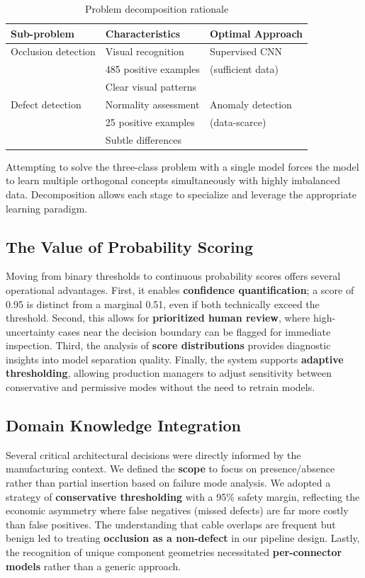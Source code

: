 \documentclass[11pt,a4paper,draft]{article}
\begin{document}
\begin{table}[H]
\centering
\begin{tabular}{lll}
\toprule
\textbf{Sub-problem} & \textbf{Characteristics} & \textbf{Optimal Approach} \\
\midrule
Occlusion detection & Visual recognition & Supervised CNN \\
 & 485 positive examples & (sufficient data) \\
 & Clear visual patterns & \\
\midrule
Defect detection & Normality assessment & Anomaly detection \\
 & 25 positive examples & (data-scarce) \\
 & Subtle differences & \\
\bottomrule
\end{tabular}
\caption{Problem decomposition rationale}
\label{tab:decomposition}
\end{table}

Attempting to solve the three-class problem with a single model forces the model to learn multiple orthogonal concepts simultaneously with highly imbalanced data. Decomposition allows each stage to specialize and leverage the appropriate learning paradigm.

\subsection{The Value of Probability Scoring}

Moving from binary thresholds to continuous probability scores offers several operational advantages. First, it enables \textbf{confidence quantification}; a score of 0.95 is distinct from a marginal 0.51, even if both technically exceed the threshold. Second, this allows for \textbf{prioritized human review}, where high-uncertainty cases near the decision boundary can be flagged for immediate inspection. Third, the analysis of \textbf{score distributions} provides diagnostic insights into model separation quality. Finally, the system supports \textbf{adaptive thresholding}, allowing production managers to adjust sensitivity between conservative and permissive modes without the need to retrain models.

\subsection{Domain Knowledge Integration}

Several critical architectural decisions were directly informed by the manufacturing context. We defined the \textbf{scope} to focus on presence/absence rather than partial insertion based on failure mode analysis. We adopted a strategy of \textbf{conservative thresholding} with a 95\% safety margin, reflecting the economic asymmetry where false negatives (missed defects) are far more costly than false positives. The understanding that cable overlaps are frequent but benign led to treating \textbf{occlusion as a non-defect} in our pipeline design. Lastly, the recognition of unique component geometries necessitated \textbf{per-connector models} rather than a generic approach.
\end{document}
